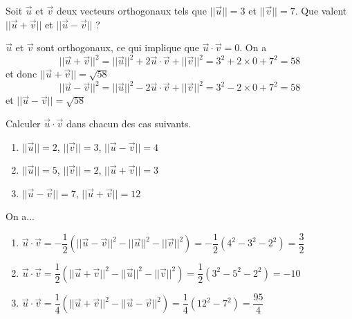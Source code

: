 \documentclass[11pt,fleqn, openany]{book} %
\begin{document}
\begin{exercise}Soit $\vec u$ et $\vec v$ deux vecteurs orthogonaux tels que $\lvert\lvert\vec{u}\rvert\rvert=3$ et $\lvert\lvert\vec{v}\rvert\rvert=7$. Que valent $\lvert\lvert\vec u + \vec v\rvert\rvert$ et $\lvert\lvert\vec u -\vec v\rvert\rvert$ ?\end{exercise}

\begin{solution}$\vec u$ et $\vec v$ sont orthogonaux, ce qui implique que $\vec u \cdot \vec v = 0$. On a 
\[\lvert\lvert\vec u + \vec v\rvert\rvert^2 = \lvert\lvert\vec{u}\rvert\rvert^2 + 2 \vec u \cdot \vec v + \lvert\lvert\vec{v}\rvert\rvert^2 = 3^2+2\times 0 + 7^2 = 58\]
et donc $\lvert\lvert\vec u + \vec v\rvert\rvert=\sqrt{58}$
\[\lvert\lvert\vec u - \vec v\rvert\rvert^2 = \lvert\lvert\vec{u}\rvert\rvert^2 - 2 \vec u \cdot \vec v + \lvert\lvert\vec{v}\rvert\rvert^2 = 3^2-2\times 0 + 7^2 = 58\]
et $\lvert\lvert\vec u - \vec v\rvert\rvert=\sqrt{58}$\end{solution}




\begin{exercise}Calculer $\vec{u} \cdot \vec{v}$ dans chacun des cas suivants.
\begin{enumerate}
\item $\lvert\lvert\vec{u}\rvert\rvert=2$, $\lvert\lvert\vec{v}\rvert\rvert=3$, $\lvert\lvert\vec{u}-\vec{v}\rvert\rvert=4$
\item $\lvert\lvert\vec{u}\rvert\rvert=5$, $\lvert\lvert\vec{v}\rvert\rvert=2$, $\lvert\lvert\vec{u}+\vec{v}\rvert\rvert=3$
\item $\lvert\lvert\vec{u}-\vec{v}\rvert\rvert=7$, $\lvert\lvert\vec{u}+\vec{v}\rvert\rvert=12$
\end{enumerate}\end{exercise}

\begin{solution} On a...
\begin{enumerate}
\item $\vec{u} \cdot \vec{v}= -\dfrac{1}{2}(\lvert\lvert\vec{u}-\vec{v}\rvert\rvert^2-\lvert\lvert\vec{u}\rvert\rvert^2-\lvert\lvert\vec{v}\rvert\rvert^2)=-\dfrac{1}{2}(4^2-3^2-2^2)=\dfrac{3}{2}$
\vskip5pt
\item $\vec{u} \cdot \vec{v}= \dfrac{1}{2}(\lvert\lvert\vec{u}+\vec{v}\rvert\rvert^2-\lvert\lvert\vec{u}\rvert\rvert^2-\lvert\lvert\vec{v}\rvert\rvert^2)=\dfrac{1}{2}(3^2-5^2-2^2)=-10$
\vskip5pt
\item $\vec{u} \cdot \vec{v} = \dfrac{1}{4}( \lvert\lvert\vec{u}+\vec{v}\rvert\rvert^2-\lvert\lvert\vec{u}-\vec{v}\rvert\rvert^2 )=\dfrac{1}{4}(12^2-7^2)=\dfrac{95}{4}$
\end{enumerate}\end{solution}
\end{document}
